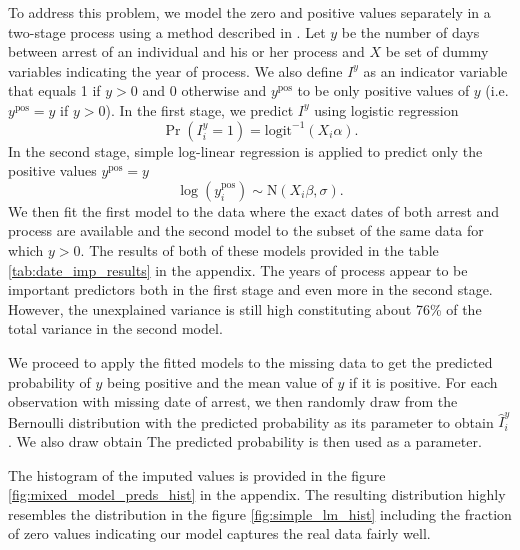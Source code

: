 To address this problem, we model the zero and positive values separately in a two-stage process 
using a method described in \citet[p. 537-538]{gelman_data_2006}. 
Let $y$ be the number of days between arrest of an individual and his or her process and $X$ be set of dummy variables indicating the year of process. We also define $I^y$ as an indicator variable that equals 1 if $y > 0$ and 0 otherwise and  $y^{\text{pos}}$ to be only positive values of $y$ (i.e. $y^{\text{pos}} = y$ if   $y > 0$).  In the first stage, we predict $I^y$  using logistic regression
\begin{equation}
\Pr\left( I_i^y = 1 \right)  = \text{logit}^{-1} \left(X_i \alpha \right).
\end{equation}
In the second stage, simple log-linear regression is applied to predict only the positive values $y^{\text{pos}} = y$
\begin{equation}
\log\left(y_i^{\text{pos}}\right) \sim \text{N} \left(X_i \beta, \sigma \right).
\end{equation}
We then fit the first model to the data where the exact dates of both arrest and process are available and the second model to the subset of the same  data for which $y > 0$.
The results of both of these models provided in the table \ref{tab:date_imp_results} in the appendix. The years of process appear to be important predictors both in the first stage and even more in the second stage. 
However, the unexplained variance is still high constituting about 76\% of the total variance in the second model. 

We  proceed to apply the fitted models to the missing data to get the predicted probability of $y$  being positive and the mean value of $y$ if it is positive. For each observation with missing date of arrest, we then randomly draw from the Bernoulli distribution with the predicted probability as its parameter to obtain $\hat I_i^y$. We also draw  obtain
The predicted probability is then used as a parameter.

The histogram of the imputed values is provided in the figure \ref{fig:mixed_model_preds_hist} in the appendix. 
The resulting distribution  highly resembles the distribution  in the figure \ref{fig:simple_lm_hist} including the fraction of zero values indicating our model captures the real data fairly well. 

